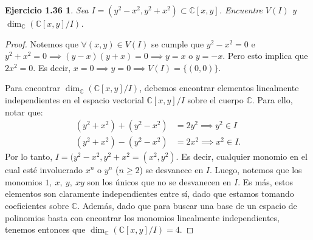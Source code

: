 \documentclass{amsart}
\theoremstyle{plain}
\newtheorem*{ejercicio3}{Ejercicio 1.36}
\newcommand{\C}{\mathbb{C}}
\begin{document}
	\begin{ejercicio3}
		Sea $I = (y^{2} - x^{2}, y^{2} + x^{2}) \subset \C[x,y]$. Encuentre $V(I)$ y $\dim_{\C}(\C[x,y] \slash I)$.
	\end{ejercicio3}
	\begin{proof}
		Notemos que $\forall (x,y) \in V(I)$ se cumple que $y^{2} - x^{2} = 0$ e $y^{2} + x^{2} = 0 \implies (y - x)(y + x) = 0 \implies y = x$ o $y = -x$. Pero esto implica que $2x^{2} = 0$. Es decir, $x = 0 \implies y = 0 \implies V(I) = \{(0,0)\}$. \par
		Para encontrar $\dim_{\C}(\C[x,y] \slash I)$, debemos encontrar elementos linealmente independientes en el espacio vectorial $\C[x,y] \slash I$ sobre el cuerpo $\C$. Para ello, notar que:
		\begin{align*}
			(y^{2} + x^{2}) + (y^{2} - x^{2}) &= 2y^{2} \implies y^{2} \in I \\
			(y^{2} + x^{2}) - (y^{2} - x^{2}) &= 2x^{2} \implies x^{2} \in I
		.\end{align*}
		Por lo tanto, $I = (y^{2} - x^{2}, y^{2} + x^{2} = (x^{2}, y^{2})$. Es decir, cualquier monomio en el cual esté involucrado $x^{n}$ o $y^{n}$ ($n \geq 2$) se desvanece en $I$. Luego, notemos que los monomios $1,\ x,\ y,\ xy$ son los únicos que no se desvanecen en $I$. Es más, estos elementos son claramente independientes entre sí, dado que estamos tomando coeficientes sobre $\C$. Además, dado que para buscar una base de un espacio de polinomios basta con encontrar los monomios linealmente independientes, tenemos entonces que $\dim_{\C}(\C[x,y] \slash I) = 4$.
	\end{proof}
\end{document}

